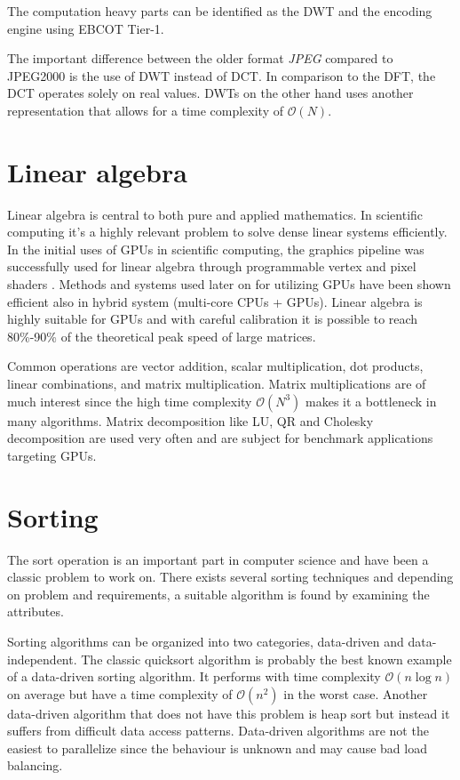 The computation heavy parts can be identified as the \gls{DWT} and the encoding engine using \gls{EBCOT} Tier-1.

The important difference between the older format \emph{JPEG} compared to JPEG2000 is the use of \gls{DWT} instead of \gls{DCT}. In comparison to the \gls{DFT}, the \gls{DCT} operates solely on real values. \gls{DWT}s on the other hand uses another representation that allows for a time complexity of $\mathcal{O}(N)$.

\section{Linear algebra}
Linear algebra is central to both pure and applied mathematics. In scientific computing it's a highly relevant problem to solve dense linear systems efficiently. In the initial uses of GPUs in scientific computing, the graphics pipeline was successfully used for linear algebra through programmable vertex and pixel shaders \cite{kruger2003linear}. Methods and systems used later on for utilizing \gls{GPU}s have been shown efficient also in hybrid system (multi-core \gls{CPU}s + \gls{GPU}s)\cite{tomov2010dense}. Linear algebra is highly suitable for \gls{GPU}s and with careful calibration it is possible to reach 80\%-90\% of the theoretical peak speed of large matrices\cite{volkov2008benchmarking}.

Common operations are vector addition, scalar multiplication, dot products, linear combinations, and matrix multiplication. Matrix multiplications are of much interest since the high time complexity $\mathcal{O}(N^3)$ makes it a bottleneck in many algorithms. Matrix decomposition like LU, QR and Cholesky decomposition are used very often and are subject for benchmark applications targeting \gls{GPU}s\cite{volkov2008benchmarking}.

\section{Sorting}
The sort operation is an important part in computer science and have been a classic problem to work on. There exists several sorting techniques and depending on problem and requirements, a suitable algorithm is found by examining the attributes.

Sorting algorithms can be organized into two categories, data-driven and data-independent. The classic quicksort algorithm is probably the best known example of a data-driven sorting algorithm. It performs with time complexity $\mathcal{O}(n\log{n})$ on average but have a time complexity of $\mathcal{O}(n^2)$ in the worst case. Another data-driven algorithm that does not have this problem is heap sort but instead it suffers from difficult data access patterns. Data-driven algorithms are not the easiest to parallelize since the behaviour is unknown and may cause bad load balancing.

